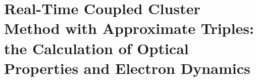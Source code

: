 \chapter{Real-Time Coupled Cluster Method with Approximate Triples: the Calculation of Optical Properties and Electron Dynamics} \label{ch-4}




